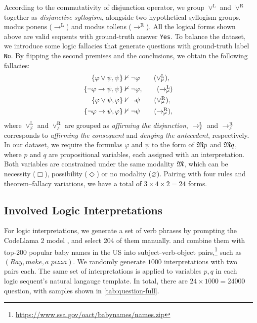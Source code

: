 According to the commutativity of disjunction operator, we group $\lor^\mathrm{L}$ and $\lor^\mathrm{R}$ together as \textit{disjunctive syllogism}, alongside two hypothetical syllogism groups, modus ponens ($\to^\mathrm{L}$) and modus tollens ($\to^\mathrm{R}$).
All the logical forms shown above are valid sequents with ground-truth answer \texttt{Yes}.
To balance the dataset, we introduce some logic fallacies that generate questions with ground-truth label \texttt{No}.
By flipping the second premises and the conclusions, we obtain the following fallacies:
\begin{align*}
    \left\{\varphi \lor \psi, \psi\right\} & \nvdash \lnot \varphi \tag{$\lor^\mathrm{L}_{\nvdash}$}, \label{eqn:fallacy-inf-rule-or-left}       \\
    \{\lnot \varphi \to \psi, \psi\}       & \nvdash \lnot \varphi, \tag{$\to^{\mathrm{L}}_{\nvdash}$}   \label{eqn:fallacy-inf-rule-imply-left} \\
    \{\varphi \lor \psi , \varphi\}        & \nvdash \lnot \psi \tag{$\lor^\mathrm{R}_{\nvdash}$}, \label{eqn:fallacy-inf-rule-or-right}         \\
    \{\lnot \varphi \to \psi, \varphi\}    & \nvdash \lnot \psi \tag{$\to^\mathrm{R}_{\nvdash}$}, \label{eqn:fallacy-inf-rule-imply-right}
\end{align*}
where $\lor^\mathrm{L}_{\nvdash}$ and $\lor^\mathrm{R}_{\nvdash}$ are grouped as \textit{affirming the disjunction}, $\to^{\mathrm{L}}_{\nvdash}$ and $\to^\mathrm{R}_{\nvdash}$ corresponds to \textit{affirming the consequent} and \textit{denying the antecedent}, respectively.
In our dataset, we require the formulas \(\varphi\) and \(\psi\) to the form of \(\mathfrak{M} p\) and \(\mathfrak{M} q\),  where \(p\) and \(q\) are propositional variables, each assigned with an interpretation.
Both variables are constrained under the same modality \(\mathfrak{M}\), which can be necessity ($\Box$), possibility ($\Diamond$) or no modality ($\varnothing$).
Pairing with four rules and theorem--fallacy variations, we have a total of $3\times 4\times 2=24$ forms.

\subsection{Involved Logic Interpretations}

For logic interpretations, we generate a set of verb phrases by prompting the CodeLlama 2 model \citep{roziereCodeLlamaOpen2024}, and select 204 of them manually.
and combine them with top-200 popular baby names in the US into subject-verb-object pairs,\footnote{\url{https://www.ssa.gov/oact/babynames/names.zip}} such as \(\left(\textit{Ray}, \textit{make}, \textit{a pizza}\right)\).
We randomly generate $1000$ interpretations with two pairs each.
The same set of interpretations is applied to variables $p, q$ in each logic sequent's natural langauge template.
In total, there are $24\times 1000 = 24000$ question, with samples shown in \cref{tab:question-full}.
